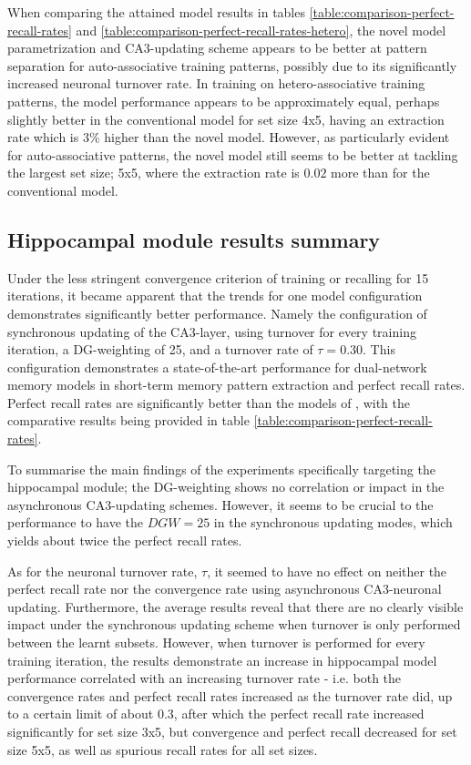 When comparing the attained model results in tables \ref{table:comparison-perfect-recall-rates} and \ref{table:comparison-perfect-recall-rates-hetero}, the novel model parametrization and CA3-updating scheme appears to be better at pattern separation for auto-associative training patterns, possibly due to its significantly increased neuronal turnover rate. In training on hetero-associative training patterns, the model performance appears to be approximately equal, perhaps slightly better in the conventional model for set size 4x5, having an extraction rate which is $3 \%$ higher than the novel model. However, as particularly evident for auto-associative patterns, the novel model still seems to be better at tackling the largest set size; 5x5, where the extraction rate is $0.02$ more than for the conventional model.

\subsection{Hippocampal module results summary}

Under the less stringent convergence criterion of training or recalling for 15 iterations, it became apparent that the trends for one model configuration demonstrates significantly better performance. Namely the configuration of synchronous updating of the CA3-layer, using turnover for every training iteration, a DG-weighting of 25, and a turnover rate of $\tau=0.30$.
This configuration demonstrates a state-of-the-art performance for dual-network memory models in short-term memory pattern extraction and perfect recall rates. Perfect recall rates are significantly better than the models of \citep{Hattori2014, Hattori2010}, with the comparative results being provided in table \ref{table:comparison-perfect-recall-rates}.


To summarise the main findings of the experiments specifically targeting the hippocampal module; the DG-weighting shows no correlation or impact in the asynchronous CA3-updating schemes. However, it seems to be crucial to the performance to have the $DGW=25$ in the synchronous updating modes, which yields about twice the perfect recall rates.

As for the neuronal turnover rate, $\tau$, it seemed to have no effect on neither the perfect recall rate nor the convergence rate using asynchronous CA3-neuronal updating. Furthermore, the average results reveal that there are no clearly visible impact under the synchronous updating scheme when turnover is only performed between the learnt subsets. However, when turnover is performed for every training iteration, the results demonstrate an increase in hippocampal model performance correlated with an increasing turnover rate - i.e. both the convergence rates and perfect recall rates increased as the turnover rate did, up to a certain limit of about 0.3, after which the perfect recall rate increased significantly for set size 3x5, but convergence and perfect recall decreased for set size 5x5, as well as spurious recall rates for all set sizes.

